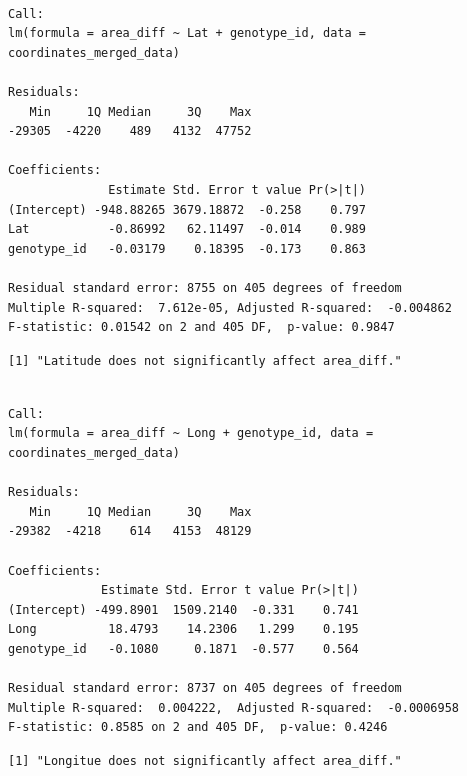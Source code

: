 \documentclass[
  11pt,
]{article}
\begin{document}
\begin{verbatim}

Call:
lm(formula = area_diff ~ Lat + genotype_id, data = coordinates_merged_data)

Residuals:
   Min     1Q Median     3Q    Max 
-29305  -4220    489   4132  47752 

Coefficients:
              Estimate Std. Error t value Pr(>|t|)
(Intercept) -948.88265 3679.18872  -0.258    0.797
Lat           -0.86992   62.11497  -0.014    0.989
genotype_id   -0.03179    0.18395  -0.173    0.863

Residual standard error: 8755 on 405 degrees of freedom
Multiple R-squared:  7.612e-05, Adjusted R-squared:  -0.004862 
F-statistic: 0.01542 on 2 and 405 DF,  p-value: 0.9847
\end{verbatim}

\begin{verbatim}
[1] "Latitude does not significantly affect area_diff."
\end{verbatim}

\begin{verbatim}

Call:
lm(formula = area_diff ~ Long + genotype_id, data = coordinates_merged_data)

Residuals:
   Min     1Q Median     3Q    Max 
-29382  -4218    614   4153  48129 

Coefficients:
             Estimate Std. Error t value Pr(>|t|)
(Intercept) -499.8901  1509.2140  -0.331    0.741
Long          18.4793    14.2306   1.299    0.195
genotype_id   -0.1080     0.1871  -0.577    0.564

Residual standard error: 8737 on 405 degrees of freedom
Multiple R-squared:  0.004222,  Adjusted R-squared:  -0.0006958 
F-statistic: 0.8585 on 2 and 405 DF,  p-value: 0.4246
\end{verbatim}

\begin{verbatim}
[1] "Longitue does not significantly affect area_diff."
\end{verbatim}
\end{document}
